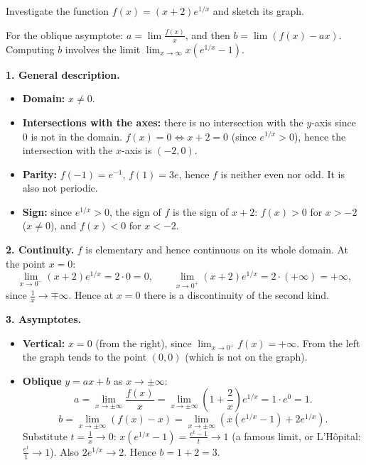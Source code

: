 
\begin{question}
Investigate the function $f(x)=(x+2)e^{1/x}$ and sketch its graph.
\end{question}

\begin{hint}
For the oblique asymptote: $a=\lim\frac{f(x)}{x}$, and then $b=\lim(f(x)-ax)$. Computing $b$ involves the limit $\lim_{x\to\infty}x\left(e^{1/x}-1\right)$.
\end{hint}

\begin{solution}
\textbf{1. General description.}
\begin{itemize}
  \item \textbf{Domain:} $x\neq0$.
  \item \textbf{Intersections with the axes:} there is no intersection with the $y$-axis since $0$ is not in the domain. $f(x)=0\iff x+2=0$ (since $e^{1/x}>0$), hence the intersection with the $x$-axis is $(-2,0)$.
  \item \textbf{Parity:} $f(-1)=e^{-1}$, $f(1)=3e$, hence $f$ is neither even nor odd. It is also not periodic.
  \item \textbf{Sign:} since $e^{1/x}>0$, the sign of $f$ is the sign of $x+2$: $f(x)>0$ for $x>-2$ ($x\neq0$), and $f(x)<0$ for $x<-2$.
\end{itemize}

\textbf{2. Continuity.} $f$ is elementary and hence continuous on its whole domain. At the point $x=0$:
\[ \lim_{x\to0^-}(x+2)e^{1/x}=2\cdot0=0,\qquad \lim_{x\to0^+}(x+2)e^{1/x}=2\cdot(+\infty)=+\infty, \]
since $\frac1x\to\mp\infty$. Hence at $x=0$ there is a discontinuity of the second kind.

\textbf{3. Asymptotes.}
\begin{itemize}
  \item \textbf{Vertical:} $x=0$ (from the right), since $\lim_{x\to0^+}f(x)=+\infty$. From the left the graph tends to the point $(0,0)$ (which is not on the graph).
  \item \textbf{Oblique} $y=ax+b$ as $x\to\pm\infty$:
  \[ a=\lim_{x\to\pm\infty}\frac{f(x)}{x}=\lim_{x\to\pm\infty}\left(1+\frac2x\right)e^{1/x}=1\cdot e^0=1. \]
  \[ b=\lim_{x\to\pm\infty}\left(f(x)-x\right)=\lim_{x\to\pm\infty}\left(x\left(e^{1/x}-1\right)+2e^{1/x}\right). \]
  Substitute $t=\frac1x\to0$: $x\left(e^{1/x}-1\right)=\frac{e^t-1}{t}\to1$ (a famous limit, or L'Hôpital: $\frac{e^t}{1}\to1$). Also $2e^{1/x}\to2$. Hence $b=1+2=3$.


\end{itemize}
\end{solution}
